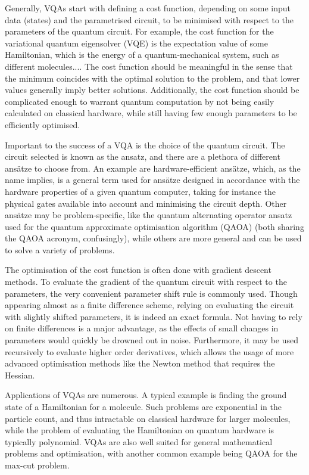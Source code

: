 Generally, VQAs start with defining a cost function, depending on some input data (states) and the parametrised circuit, to be minimised with respect to the parameters of the quantum circuit.
For example, the cost function for the variational quantum eigensolver (VQE) is the expectation value of some Hamiltonian, which is the energy of a quantum-mechanical system, such as different molecules....
The cost function should be meaningful in the sense that the minimum coincides with the optimal solution to the problem, and that lower values generally imply better solutions.
Additionally, the cost function should be complicated enough to warrant quantum computation by not being easily calculated on classical hardware, while still having few enough parameters to be efficiently optimised.

Important to the success of a VQA is the choice of the quantum circuit.
The circuit selected is known as the ansatz, and there are a plethora of different ansätze to choose from.
An example are hardware-efficient ansätze, which, as the name implies, is a general term used for ansätze designed in accordance with the hardware properties of a given quantum computer, taking for instance the physical gates available into account and minimising the circuit depth.
Other ansätze may be problem-specific, like the quantum alternating operator ansatz used for the quantum approximate optimisation algorithm (QAOA) (both sharing the QAOA acronym, confusingly), while others are more general and can be used to solve a variety of problems.

The optimisation of the cost function is often done with gradient descent methods.
To evaluate the gradient of the quantum circuit with respect to the parameters, the very convenient parameter shift rule is commonly used.
Though appearing almost as a finite difference scheme, relying on evaluating the circuit with slightly shifted parameters, it is indeed an exact formula.
Not having to rely on finite differences is a major advantage, as the effects of small changes in parameters would quickly be drowned out in noise.
Furthermore, it may be used recursively to evaluate higher order derivatives, which allows the usage of more advanced optimisation methods like the Newton method that requires the Hessian.

Applications of VQAs are numerous.
A typical example is finding the ground state of a Hamiltonian for a molecule.
Such problems are exponential in the particle count, and thus intractable on classical hardware for larger molecules, while the problem of evaluating the Hamiltonian on quantum hardware is typically polynomial.
VQAs are also well suited for general mathematical problems and optimisation, with another common example being QAOA for the max-cut problem.


